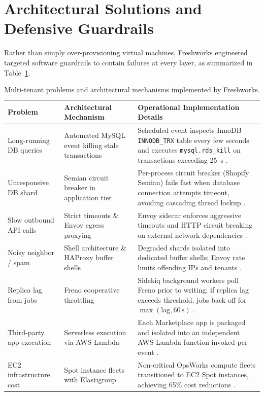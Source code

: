 \documentclass[10pt,a4paper]{article}
\begin{document}
\section{Architectural Solutions and Defensive Guardrails}
Rather than simply over-provisioning virtual machines, Freshworks engineered targeted software guardrails to contain failures at every layer, as summarized in Table~\ref{tab:problems_solutions}.

\begin{table}[H]
\centering
\caption{Multi-tenant problems and architectural mechanisms implemented by Freshworks.}
\label{tab:problems_solutions}
\small
\begin{tabularx}{\textwidth}{l p{4.2cm} X}
\toprule
\textbf{Problem} & \textbf{Architectural Mechanism} & \textbf{Operational Implementation Details} \\
\midrule
Long-running DB queries & Automated MySQL event killing stale transactions & Scheduled event inspects InnoDB \texttt{INNODB\_TRX} table every few seconds and executes \texttt{mysql.rds\_kill} on transactions exceeding 25~s \cite{fw_scale_2020}. \\
Unresponsive DB shard & Semian circuit breaker in application tier & Per-process circuit breaker (Shopify Semian) fails fast when database connection attempts timeout, avoiding cascading thread lockup \cite{fw_scale_2020}. \\
Slow outbound API calls & Strict timeouts \& Envoy egress proxying & Envoy sidecar enforces aggressive timeouts and HTTP circuit breaking on external network dependencies \cite{fw_scale_2020}. \\
Noisy neighbor / spam & Shell architecture \& HAProxy buffer shells & Degraded shards isolated into dedicated buffer shells; Envoy rate limits offending IPs and tenants \cite{fw_haproxy_2021}. \\
Replica lag from jobs & Freno cooperative throttling & Sidekiq background workers poll Freno prior to writing; if replica lag exceeds threshold, jobs back off for $\max(\text{lag}, 60\,\text{s})$ \cite{fw_freno}. \\
Third-party app execution & Serverless execution via AWS Lambda & Each Marketplace app is packaged and isolated into an independent AWS Lambda function invoked per event \cite{aws_freshworks_lambda}. \\
EC2 infrastructure cost & Spot instance fleets with Elastigroup & Non-critical OpsWorks compute fleets transitioned to EC2 Spot instances, achieving 65\% cost reductions \cite{spot_freshworks}. \\
\bottomrule
\end{tabularx}
\end{table}
\end{document}

